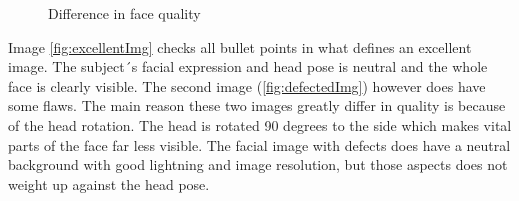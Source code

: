 \begin{figure}[h]
\centering
    \caption{Difference in face quality}
\end{figure}

Image \ref{fig:excellentImg} checks all bullet points in what defines an excellent image. The subject´s facial expression and head pose is neutral and the whole face is clearly visible. The second image (\ref{fig:defectedImg}) however does have some flaws. The main reason these two images greatly differ in quality is because of the head rotation. The head is rotated 90 degrees to the side which makes vital parts of the face far less visible. The facial image with defects does have a neutral background with good lightning and image resolution, but those aspects does not weight up against the head pose.
\newpage

